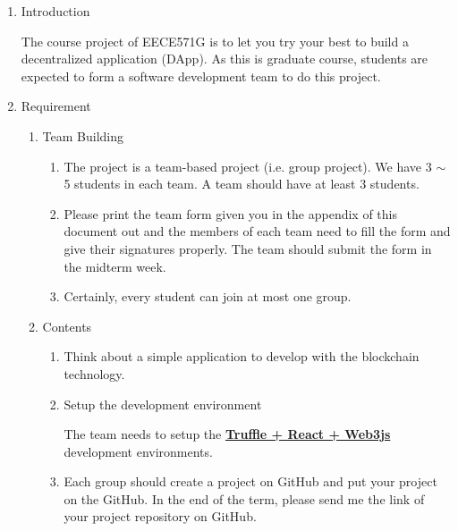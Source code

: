 \documentclass[12pt]{article}
\renewcommand{\_}{\kern-1.5pt\textunderscore\kern-1.5pt}
\begin{document}
\vspace{\baselineskip}
\begin{enumerate}
	\item Introduction\par

The course project of EECE571G is to let you try your best to build a decentralized application (DApp). As this is graduate course, students are expected to form a software development team to do this project. \par

	\item Requirement\par

\begin{enumerate}
	\item Team Building\par

\begin{enumerate}
	\item The project is a team-based project (i.e. group project). We have 3 $ \sim $  5 students in each team. A team should have at least 3 students. \par

	\item Please print the team form given you in the appendix of this document out and the members of each team need to fill the form and give their signatures properly. The team should submit the form in the midterm week.\par

	\item Certainly, every student can join at most one group. \par


\end{enumerate}
	\item Contents\par

\begin{enumerate}
	\item Think about a simple application to develop with the blockchain technology.\  \par

	\item Setup the development environment \par

The team needs to setup the \textbf{\uline{Truffle + React + Web3js}} development environments. \par

	\item Each group should create a project on GitHub and put your project on the GitHub. In the end of the term, please send me the link of your project repository on GitHub. \par


\end{enumerate}
\end{enumerate}
\end{enumerate}
\end{document}
